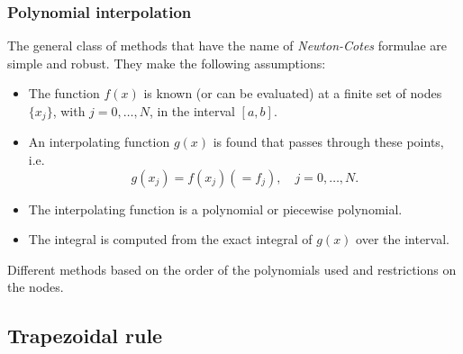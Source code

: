 \documentclass{beamer}
\begin{document}
\begin{frame}
  \frametitle{Polynomial interpolation}

  The general class of methods that have the name of
  \emph{Newton-Cotes} formulae are simple and robust. They make the
  following assumptions:
  \begin{itemize}
  \item The function $f(x)$ is known (or can be evaluated) at a finite
    set of nodes $\{x_j\}$, with $j = 0, \dots, N$, in the interval
    $[a, b]$. \pause
  \item An interpolating function $g(x)$ is found that passes through
    these points, i.e.\
    \begin{equation*}
      g(x_j) = f(x_j) \left( = f_j \right), \quad j = 0, \dots, N.
    \end{equation*} \pause
  \item The interpolating function is a polynomial or piecewise
    polynomial. \pause
  \item The integral is computed from the exact integral of $g(x)$
    over the interval.
  \end{itemize} \pause

  Different methods based on the order of the polynomials used and
  restrictions on the nodes.

\end{frame}


\subsection{Trapezoidal rule}
\end{document}
